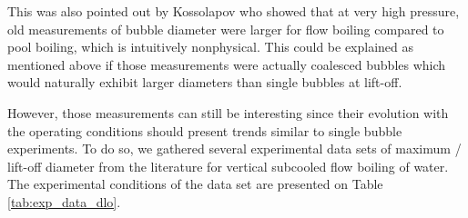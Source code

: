 \npar

This was also pointed out by Kossolapov \cite{kossolapov_experimental_2021} who showed that at very high pressure, old measurements of bubble diameter were larger for flow boiling compared to pool boiling, which is intuitively nonphysical. This could be explained as mentioned above if those measurements were actually coalesced bubbles which would naturally exhibit larger diameters than single bubbles at lift-off.  

\npar

However, those measurements can still be interesting since their evolution with the operating conditions should present trends similar to single bubble experiments. To do so, we gathered several experimental data sets of maximum / lift-off diameter from the literature for vertical subcooled flow boiling of water. The experimental conditions of the data set are presented on Table \ref{tab:exp_data_dlo}.



